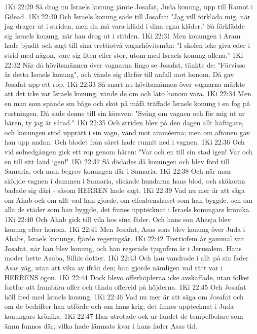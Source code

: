 1Ki 22:29  Så drog nu Israels konung jämte Josafat, Juda konung, upp till Ramot i Gilead.
1Ki 22:30  Och Israels konung sade till Josafat: "Jag vill förkläda mig, när jag drager ut i striden, men du må vara klädd i dina egna kläder." Så förklädde sig Israels konung, när han drog ut i striden.
1Ki 22:31  Men konungen i Aram hade bjudit och sagt till sina trettiotvå vagnshövitsmän: "I skolen icke giva eder i strid med någon, vare sig liten eller stor, utom med Israels konung allena."
1Ki 22:32  När då hövitsmännen över vagnarna fingo se Josafat, tänkte de: "Förvisso är detta Israels konung", och vände sig därför till anfall mot honom. Då gav Josafat upp ett rop.
1Ki 22:33  Så snart nu hövitsmännen över vagnarna märkte att det icke var Israels konung, vände de om och läto honom vara.
1Ki 22:34  Men en man som spände sin båge och sköt på måfå träffade Israels konung i en fog på rustningen. Då sade denne till sin körsven: "Sväng om vagnen och för mig ut ur hären, ty jag är sårad."
1Ki 22:35  Och striden blev på den dagen allt häftigare, och konungen stod upprätt i sin vagn, vänd mot araméerna; men om aftonen gav han upp andan. Och blodet från såret hade runnit ned i vagnen.
1Ki 22:36  Och vid solnedgången gick ett rop genom hären: "Var och en till sin stad igen! Var och en till sitt land igen!"
1Ki 22:37  Så dödades då konungen och blev förd till Samaria; och man begrov konungen där i Samaria.
1Ki 22:38  Och när man sköljde vagnen i dammen i Samaria, slickade hundarna hans blod, och skökorna badade sig däri - såsom HERREN hade sagt.
1Ki 22:39  Vad nu mer är att säga om Ahab och om allt vad han gjorde, om elfenbenshuset som han byggde, och om alla de städer som han byggde, det finnes upptecknat i Israels konungars krönika.
1Ki 22:40  Och Ahab gick till vila hos sina fäder. Och hans son Ahasja blev konung efter honom.
1Ki 22:41  Men Josafat, Asas sons blev konung över Juda i Ahabs, Israels konungs, fjärde regeringsår.
1Ki 22:42  Trettiofem år gammal var Josafat, när han blev konung, och han regerade tjugufem år i Jerusalem. Hans moder hette Asuba, Silhis dotter.
1Ki 22:43  Och han vandrade i allt på sin fader Asas väg, utan att vika av ifrån den; han gjorde nämligen vad rätt var i HERRENS ögon.
1Ki 22:44  Dock blevo offerhöjderna icke avskaffade, utan folket fortfor att frambära offer och tända offereld på höjderna.
1Ki 22:45  Och Josafat höll fred med Israels konung.
1Ki 22:46  Vad nu mer är att säga om Josafat och om de bedrifter han utförde och om hans krig, det finnes upptecknat i Juda konungars krönika.
1Ki 22:47  Han utrotade ock ur landet de tempelbolare som ännu funnos där, vilka hade lämnats kvar i hans fader Asas tid.
